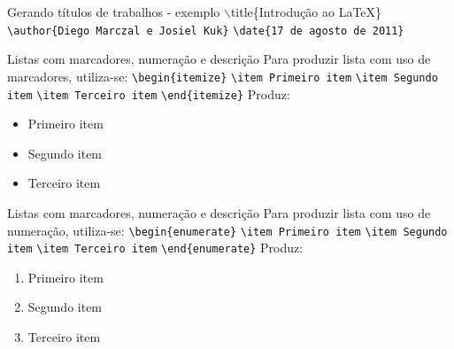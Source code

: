 \begin{frame}[fragile]{Gerando t\'itulos de trabalhos - exemplo}
$\backslash$title\{Introdução ao \LaTeX\} \newline
\verb|\author{Diego Marczal e Josiel Kuk}|\newline
\verb|\date{17 de agosto de 2011}|
\end{frame}

\begin{frame}[fragile]{Listas com marcadores, numera{\c c}\~ao e descri{\c c}\~ao}
Para produzir lista com uso de marcadores, utiliza-se: \newline
\verb|\begin{itemize}|\newline
\verb|\item Primeiro item| \newline
\verb|\item Segundo item| \newline
\verb|\item Terceiro item| \newline
\verb|\end{itemize}|
\newline \newline
Produz:
\begin{itemize}
\item Primeiro item
\item Segundo item 
\item Terceiro item
\end{itemize}
\end{frame}


\begin{frame}[fragile]{Listas com marcadores, numera{\c c}\~ao e descri{\c c}\~ao}
Para produzir lista com uso de numera{\c c}\~ao, utiliza-se: \newline
\verb|\begin{enumerate}|\newline
\verb|\item Primeiro item| \newline
\verb|\item Segundo item| \newline
\verb|\item Terceiro item| \newline
\verb|\end{enumerate}|
\newline \newline
Produz:
\begin{enumerate}
\item Primeiro item
\item Segundo item 
\item Terceiro item
\end{enumerate}
\end{frame}


